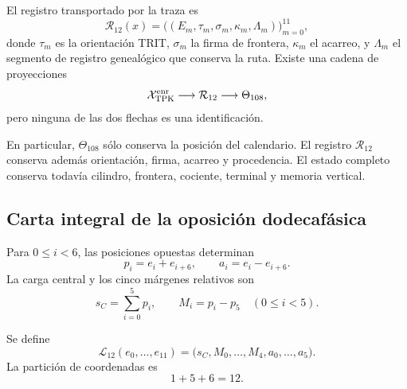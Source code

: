\begin{definition}
\label{p12-83-c10-s1:def:registro-enriquecido-dodecafasico}
El registro transportado por la traza es
\[
 \mathcal R_{12}(x)=
 \bigl((E_m,\tau_m,\sigma_m,\kappa_m,\Lambda_m)\bigr)_{m=0}^{11},
\]
donde \(\tau_m\) es la orientación TRIT, \(\sigma_m\) la firma de
frontera, \(\kappa_m\) el acarreo, y \(\Lambda_m\) el segmento de registro genealógico
que conserva la ruta. Existe una cadena de proyecciones
\[
 \mathcal X_{\rm TPK}^{\rm enr}
 \longrightarrow\mathcal R_{12}
 \longrightarrow\Theta_{108},
\]
pero ninguna de las dos flechas es una identificación.
\end{definition}

En particular, \(\Theta_{108}\) sólo conserva la posición del calendario.
El registro \(\mathcal R_{12}\) conserva además orientación, firma,
acarreo y procedencia. El estado completo conserva todavía cilindro,
frontera, cociente, terminal y memoria vertical.

\subsection{Carta integral de la oposición dodecafásica}

Para \(0\leq i<6\), las posiciones opuestas determinan
\begin{equation}
 p_i=e_i+e_{i+6},
 \qquad
 a_i=e_i-e_{i+6}.
 \label{p12-83-c10-s1:eq:pares-opuestos-registro}
\end{equation}
La carga central y los cinco márgenes relativos son
\begin{equation}
 s_C=\sum_{i=0}^{5}p_i,
 \qquad
 M_i=p_i-p_5\quad(0\leq i<5).
 \label{p12-83-c10-s1:eq:carga-margenes-registro}
\end{equation}

\begin{definition}
\label{p12-83-c10-s1:def:carta-integral-156}
Se define
\begin{equation}
 \mathcal L_{12}(e_0,\ldots,e_{11})
 =\bigl(s_C,M_0,\ldots,M_4,a_0,\ldots,a_5\bigr).
 \label{p12-83-c10-s1:eq:carta-integral-156}
\end{equation}
La partición de coordenadas es
\[
 1+5+6=12.
\]
\end{definition}

